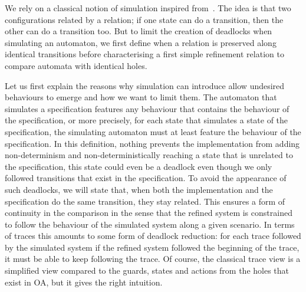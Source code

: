\documentclass[runningheads]{llncs}
\begin{document}
We rely on a classical notion of simulation inspired from~\cite{fhbisim}. The idea is that two configurations related by a relation; if one state can do a transition, then the other can do a transition too. But to limit the creation of deadlocks when simulating an automaton, we first define when a relation is preserved along identical transitions before characterising a first simple refinement relation  to compare automata with identical holes. 


Let us first explain the reasons why simulation can introduce allow undesired behaviours to emerge and how we want to limit them. 
The automaton that simulates a specification features any behaviour that contains the behaviour of the specification, or more precisely, for each state that simulates a state of the specification, the simulating automaton must at least feature the behaviour of the specification.
 In this definition, nothing prevents the implementation from adding non-determinism and non-deterministically reaching a state that is unrelated to the specification, this state could even be a deadlock even though we only followed transitions that exist in the specification.
To avoid the appearance of such deadlocks, we will state that, when both the implementation and the specification do the same transition, they stay related.
This ensures a form of continuity in the comparison in the sense that the refined system is constrained to follow the behaviour of the simulated system along a given scenario. 
In terms of traces this amounts to some form of deadlock reduction: for each trace followed by the simulated system if the refined system followed the beginning of the trace, it must be able to keep following the trace. 
Of course, the classical trace view is a simplified view compared to the guards, states and actions from  the holes that exist in OA, but it gives the right intuition.

%
\end{document}
